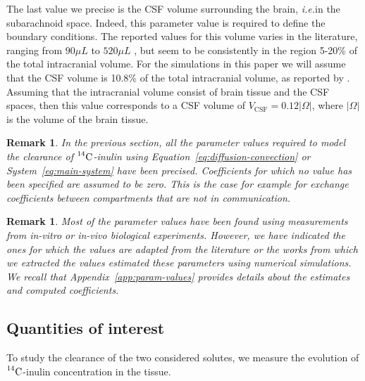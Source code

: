 \documentclass[10pt,letterpaper]{article}
\newcommand{\ie}{\emph{i.e.}\;}
\newcommand{\1}{^{(1)}}
\newcommand{\2}{^{(2)}}
\newcommand{\Cinulin}{$\prescript{14}{}{\text{C}}$-inulin }
\newtheorem{remark}[theorem]{Remark}
\begin{document}
The last value we precise is the CSF volume surrounding the brain, \ie in the subarachnoid space. Indeed, this parameter value is required to define the boundary conditions.  
The reported values for this volume varies in the literature, ranging from $90 \si{\mu L}$ \cite{pardridge2011drug} to $520 \si{\mu L}$ \cite{lai1983sampling}, but seem to be consistently in the region 5-20\% of the total intracranial volume. For the simulations in this paper we will assume that the CSF volume is 10.8\% of the total intracranial volume, as reported by \cite{murtha2014cerebrospinal}. Assuming that the intracranial volume consist of brain tissue and the CSF spaces, then this value corresponds to a CSF volume of $V_\text{CSF} = 0.12 |\Omega|$, where $|\Omega|$ is the volume of the brain tissue.

\begin{remark}
In the previous section, all the parameter values required to model the clearance of \Cinulin using Equation~\eqref{eq:diffusion-convection} or System~\eqref{eq:main-system} have been precised. Coefficients for which no value has been specified are assumed to be zero. This is the case for example for exchange coefficients between compartments that are not in communication.
\end{remark}

\begin{remark}
Most of the parameter values have been found using measurements from \textit{in-vitro} or \textit{in-vivo} biological experiments. However, we have indicated the ones for which the values are adapted from the literature or the works from which we extracted the values estimated these parameters using numerical simulations. We recall that Appendix~\ref{app:param-values} provides details about the estimates and computed coefficients.
\end{remark}


\subsection{Quantities of interest}
To study the clearance of the two considered solutes, we measure the evolution of \Cinulin concentration in the tissue.
\end{document}
